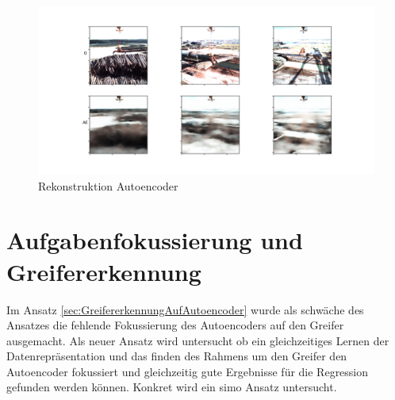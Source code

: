 	\begin{figure}[h]
		\centering
		\includegraphics[width=1\textwidth, center]{bilder/Hauptteil/Autoencoder_Grappel_Detection/OriginalPicturesAndReconstruction.png}
		\caption{Rekonstruktion Autoencoder}
		\label{img:RekonstruktionAE}
	\end{figure}  
	
	
	
	\section{Aufgabenfokussierung und Greifererkennung}
	\label{sec:MultiTaskGreifererkennung}
	Im Ansatz \ref{sec:GreifererkennungAufAutoencoder} wurde als schwäche des Ansatzes die fehlende Fokussierung des Autoencoders auf den Greifer ausgemacht. Als neuer Ansatz wird untersucht ob ein gleichzeitiges Lernen der Datenrepräsentation und das finden des Rahmens um den Greifer den Autoencoder fokussiert und gleichzeitig gute Ergebnisse für die Regression gefunden werden können. Konkret wird ein \ac{simo} Ansatz untersucht.  
